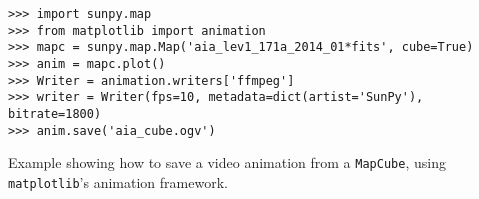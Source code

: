 \begin{listing}[H]
\begin{verbatim}
>>> import sunpy.map
>>> from matplotlib import animation
>>> mapc = sunpy.map.Map('aia_lev1_171a_2014_01*fits', cube=True)
>>> anim = mapc.plot()
>>> Writer = animation.writers['ffmpeg']
>>> writer = Writer(fps=10, metadata=dict(artist='SunPy'), bitrate=1800)
>>> anim.save('aia_cube.ogv')
\end{verbatim}
\caption{Example showing how to save a video animation from a \texttt{MapCube}, using 
\texttt{matplotlib}'s animation framework.}
\label{code:mapcube_2}
\end{listing}

